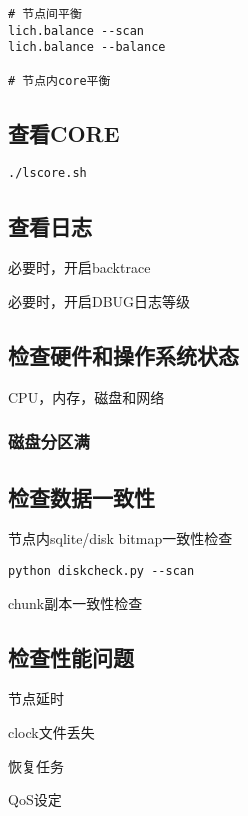 \begin{lstlisting}
# 节点间平衡
lich.balance --scan
lich.balance --balance

# 节点内core平衡
\end{lstlisting}

\subsection{查看CORE}

\begin{lstlisting}
./lscore.sh
\end{lstlisting}

\subsection{查看日志}

必要时，开启backtrace

必要时，开启DBUG日志等级

\subsection{检查硬件和操作系统状态}

CPU，内存，磁盘和网络

\subsubsection{磁盘分区满}




\subsection{检查数据一致性}

节点内sqlite/disk bitmap一致性检查

\begin{lstlisting}
python diskcheck.py --scan
\end{lstlisting}

chunk副本一致性检查

\subsection{检查性能问题}

节点延时

clock文件丢失

恢复任务

QoS设定
